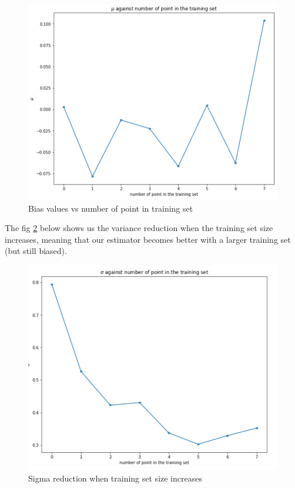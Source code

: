 \documentclass{article}
\begin{document}
\begin{figure}[H]
\centering
\includegraphics[scale=0.6]{image/mu_against_nb_pts.png}
\caption{Bias values vs number of point in training set }
\label{fig: Signal model}
\end{figure}

The fig \ref{fig: sigma reduction} below shows us the variance reduction when the training set size increases, meaning that our estimator becomes better with a larger training set (but still biased). 

\begin{figure}[H]
\centering
\includegraphics[scale=0.6]{image/sigma_reduction_signal.png}
\caption{Sigma reduction when training set size increases}
\label{fig: sigma reduction}
\end{figure}
\end{document}
